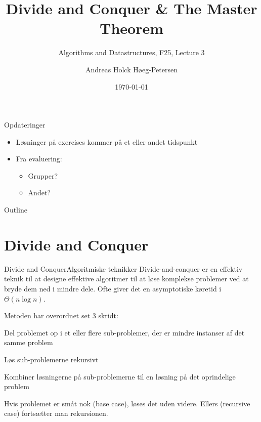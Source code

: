 \documentclass{beamer}
\title[ALG25 - Lecture 3]
{Divide and Conquer \& The Master Theorem}
\subtitle
{Algorithms and Datastructures, F25, Lecture 3}
\author[Andreas H. Høeg-Petersen]
{Andreas Holck Høeg-Petersen}
\institute[AAU]{%
  Department of Computer Science\\
  Aalborg University
}
\date {\today}
\begin{document}
\begin{frame}
  \titlepage
\end{frame}

\begin{frame}{Opdateringer}{}
    \begin{itemize}
        \item Løsninger på exercises kommer på et eller andet tidspunkt
        \item Fra evaluering:
            \begin{itemize}
                \item Grupper?
                \item Andet?
            \end{itemize}
    \end{itemize}
\end{frame}


\begin{frame}{Outline}
  \tableofcontents
\end{frame}


\section{Divide and Conquer}

\begin{frame}{Divide and Conquer}{Algoritmiske teknikker}
    Divide-and-conquer er en effektiv teknik til at designe effektive
    algoritmer til at løse komplekse problemer ved at bryde dem ned i mindre
    dele. Ofte giver det en asymptotiske køretid i $\Theta(n \log n)$.

    \pause \medskip
    Metoden har overordnet set 3 skridt:

    \pause
    \begin{description}[<+->][Combine]
        \item[Divide] Del problemet op i et eller flere sub-problemer, der er
            mindre instanser af det samme problem
        \item[Conquer] Løs sub-problemerne rekursivt
        \item[Combine] Kombiner løsningerne på sub-problemerne til en løsning på
            det oprindelige problem
    \end{description}

    \pause
    Hvis problemet er småt nok (\alert{base case}), løses det uden videre.
    Ellers (\alert{recursive case}) fortsætter man rekursionen.
\end{frame}
\end{document}

